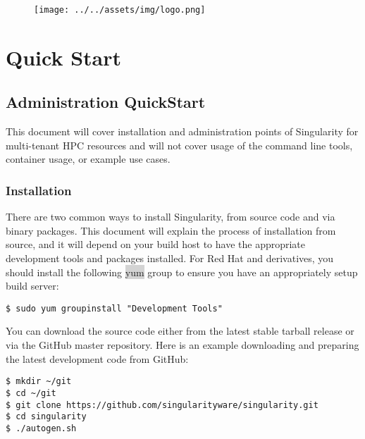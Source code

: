 \documentclass[a4paper]{article}
\date{\vspace{-5ex}}
\newcounter{subsubsubsection}[subsubsection]
\begin{document}
\lstset{language=bash}          %
\lstset{basicstyle = \ttfamily,columns=fullflexible}

\begin{figure}
\centering
{\texttt{[image: ../../assets/img/logo.png]}}
\end{figure}

\justify


\section{Quick Start}
\label{sec:quickstart}
 
\subsection{Administration QuickStart}
This document will cover installation and administration points of Singularity for multi-tenant HPC resources and will not cover usage of the command line tools, container usage, or example use cases.

\newpage


\tableofcontents
\newpage


\subsubsection{Installation}

There are two common ways to install Singularity, from source code and via binary packages. This document will explain the process of installation from source, and it will depend on your build host to have the appropriate development tools and packages installed. For Red Hat and derivatives, you should install the following \colorbox{lightgray}{yum} group to ensure you have an appropriately setup build server:
    
\begin{lstlisting}[frame=single]
$ sudo yum groupinstall "Development Tools"
\end{lstlisting}



You can download the source code either from the latest stable tarball release or via the GitHub master repository. Here is an example downloading and preparing the latest development code from GitHub:

\begin{lstlisting}[frame=single]
$ mkdir ~/git
$ cd ~/git
$ git clone https://github.com/singularityware/singularity.git
$ cd singularity
$ ./autogen.sh
\end{lstlisting}
\end{document}
